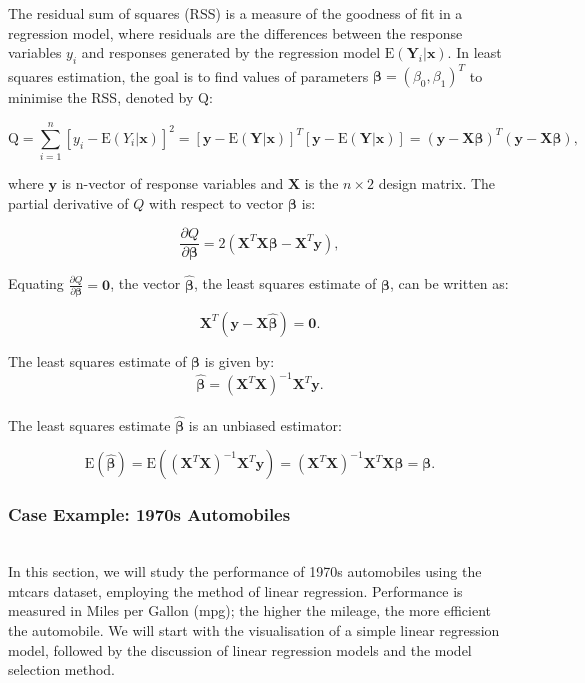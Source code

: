 \documentclass{article}\usepackage[]{graphicx}\usepackage[]{xcolor}
\numberwithin{equation}{section}
\begin{document}
\noindent The residual sum of squares (RSS) is a measure of the goodness of fit in a regression model, where residuals are the differences between the response variables $y_i$ and responses generated by the regression model $\mathrm{E}(\mathbf{Y}_i | \mathbf{x})$. In least squares estimation, the goal is to find values of parameters $\boldsymbol{\beta} = (\beta_0, \beta_1)^T$ to minimise the RSS, denoted by $\mathrm{Q}$: 

\begin{equation}\label{eq:4-3}
\mathrm{Q} = \sum_{i=1}^{n} [y_i - \mathrm{E} (Y_i | \mathbf{x})]^2 
           = [\mathbf{y}- \mathrm{E} (\mathbf{Y} | \mathbf{x})]^{T} [\mathbf{y}- \mathrm{E} (\mathbf{Y} | \mathbf{x})] 
           = (\mathbf{y}- \mathbf{X} \boldsymbol{\beta})^{T} (\mathbf{y}- \mathbf{X} \boldsymbol{\beta}),
\end{equation}

\noindent
where $\mathbf{y}$ is n-vector of response variables and $\mathbf{X}$ is the $n \times 2$ design matrix. The partial derivative of $Q$ with respect to vector $\boldsymbol{\beta}$ is:

\begin{equation}\label{eq:4-4}
\frac{\partial Q}{\partial \boldsymbol{\beta}} = 2(\mathbf{X}^T\mathbf{X} \boldsymbol{\beta} - \mathbf{X}^T\mathbf{y}),
\end{equation}

\noindent
Equating $\frac{\partial Q}{\partial \boldsymbol{\beta}} = \mathbf{0}$, the vector $\hat{\boldsymbol{\beta}}$, the least squares estimate of $\boldsymbol{\beta}$, can be written as:

\begin{equation}\label{eq:4-5}
\mathbf{X}^T(\mathbf{y}-\mathbf{X}\hat{\boldsymbol{\beta}})=\mathbf{0}.
\end{equation}

\noindent 
The least squares estimate of $\boldsymbol{\beta}$ is given by:
\begin{equation}\label{eq:4-6}
\hat{\boldsymbol{\beta}} = (\mathbf{X}^T\mathbf{X})^{-1}\mathbf{X}^T\mathbf{y}.
\end{equation}
\\ 
\noindent 
The least squares estimate $\hat{\boldsymbol{\beta}}$ is an unbiased estimator:

$$ \mathrm{E}(\hat{\boldsymbol{\beta}}) = \mathrm{E}((\mathbf{X}^T\mathbf{X})^{-1}\mathbf{X}^T\mathbf{y}) = (\mathbf{X}^T\mathbf{X})^{-1}\mathbf{X}^T\mathbf{X}\boldsymbol{\beta} = \boldsymbol{\beta}.
$$
\noident 
\subsubsection{Case Example: 1970s Automobiles}\\
\noindent In this section, we will study the performance of 1970s automobiles using the mtcars dataset, employing the method of linear regression. Performance is measured in Miles per Gallon (mpg); the higher the mileage, the more efficient the automobile. We will start with the visualisation of a simple linear regression model, followed by the discussion of linear regression models and the model selection method.
\end{document}
